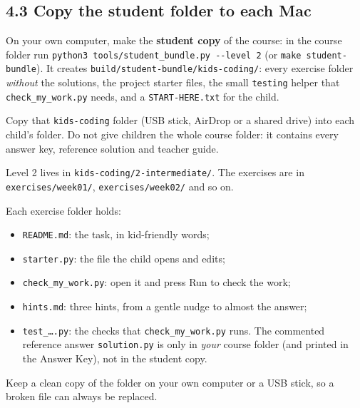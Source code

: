 \documentclass[level=2,teacher]{kidscode}
\begin{document}
\subsection{4.3 Copy the student folder to each Mac}
\begin{checklist}
  \item On your own computer, make the \textbf{student copy} of the course: in the course folder run
        \texttt{python3 tools/student\_bundle.py -{}-level 2} (or \texttt{make student-bundle}). It creates
        \texttt{build/\allowbreak student-bundle/\allowbreak kids-coding/}: every exercise folder \emph{without} the solutions, the
        project starter files, the small \texttt{testing} helper that \texttt{check\_my\_work.py} needs, and a
        \texttt{START-HERE.txt} for the child.
  \item Copy that \texttt{kids-coding} folder (USB stick, AirDrop or a shared drive) into each child's
         folder. Do not give children the whole course folder: it contains every answer key,
        reference solution and teacher guide.
  \item Level 2 lives in \texttt{kids-coding/2-intermediate/}. The exercises are in
        \texttt{exercises/week01/}, \texttt{exercises/week02/} and so on.
  \item Each exercise folder holds:
        \begin{itemize}[itemsep=0pt]
          \item \texttt{README.md}: the task, in kid-friendly words;
          \item \texttt{starter.py}: the file the child opens and edits;
          \item \texttt{check\_my\_work.py}: open it and press Run to check the work;
          \item \texttt{hints.md}: three hints, from a gentle nudge to almost the answer;
          \item \texttt{test\_\ldots.py}: the checks that \texttt{check\_my\_work.py} runs. The commented reference answer
                \texttt{solution.py} is only in \emph{your} course folder (and printed in the Answer Key), not in the student copy.
        \end{itemize}
  \item Keep a clean copy of the folder on your own computer or a USB stick, so a broken file can
        always be replaced.
\end{checklist}
\end{document}
